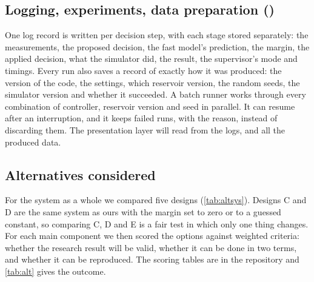 \documentclass[11pt,letterpaper]{article}
\begin{document}
\subsection{Logging, experiments, data preparation (\MahdiS)}

One log record is written per decision step, with each stage stored separately: the
measurements, the proposed decision, the fast model's prediction, the margin, the applied
decision, what the simulator did, the result, the supervisor's mode and timings. Every run
also saves a record of exactly how it was produced: the version of the code, the settings,
which reservoir version, the random seeds, the simulator version and whether it succeeded.
A batch runner works through every combination of controller, reservoir version and seed in
parallel. It can resume after an interruption, and it keeps failed runs, with the reason,
instead of discarding them. The presentation layer will read from the logs, and all the produced
data.

\subsection{Alternatives considered}

For the system as a whole we compared five designs (\cref{tab:altsys}). Designs C and D
are the same system as ours with the margin set to zero or to a guessed constant, so
comparing C, D and E is a fair test in which only one thing changes. For each main
component we then scored the options against weighted criteria: whether the research
result will be valid, whether it can be done in two terms, and whether it can be
reproduced. The scoring tables are in the repository and \cref{tab:alt} gives the outcome.
\end{document}
